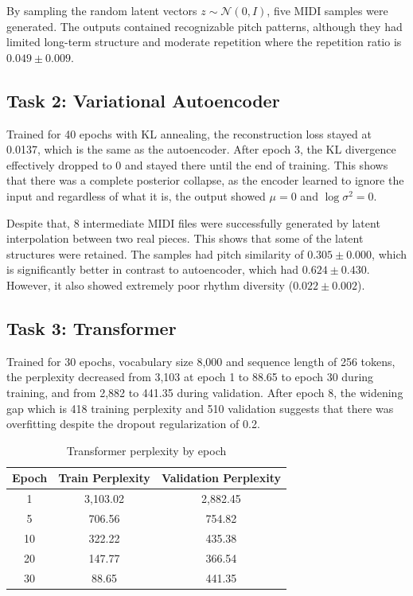 \documentclass[conference]{IEEEtran}
\begin{document}
By sampling the random latent vectors $z \sim \mathcal{N}(0,I)$, five MIDI samples were generated. The outputs contained recognizable pitch patterns, although they had limited long-term structure and moderate repetition where the repetition ratio is $0.049 \pm 0.009$.

\subsection{Task 2: Variational Autoencoder}

Trained for 40 epochs with KL annealing, the reconstruction loss stayed at 0.0137, which is the same as the autoencoder. After epoch 3, the KL divergence effectively dropped to 0 and stayed there until the end of training. This shows that there was a complete posterior collapse, as the encoder learned to ignore the input and regardless of what it is, the output showed $\mu=0$ and $\log \sigma^2=0$.

Despite that, 8 intermediate MIDI files were successfully generated by latent interpolation between two real pieces. This shows that some of the latent structures were retained. The samples had pitch similarity of $0.305 \pm 0.000$, which is significantly better in contrast to autoencoder, which had $0.624 \pm 0.430$. However, it also showed extremely poor rhythm diversity ($0.022 \pm 0.002$).

\subsection{Task 3: Transformer}

Trained for 30 epochs, vocabulary size 8,000 and sequence length of 256 tokens, the perplexity decreased from 3,103 at epoch 1 to 88.65 to epoch 30 during training, and from 2,882 to 441.35 during validation. After epoch 8, the widening gap which is 418 training perplexity and 510 validation suggests that there was overfitting despite the dropout regularization of 0.2.

\begin{table}[t]
\caption{Transformer perplexity by epoch}
\label{tab:transformer-ppl}
\centering
\begin{tabular}{ccc}
\toprule
Epoch & Train Perplexity & Validation Perplexity \\
\midrule
1 & 3,103.02 & 2,882.45 \\
5 & 706.56 & 754.82 \\
10 & 322.22 & 435.38 \\
20 & 147.77 & 366.54 \\
30 & 88.65 & 441.35 \\
\bottomrule
\end{tabular}
\end{table}
\end{document}
